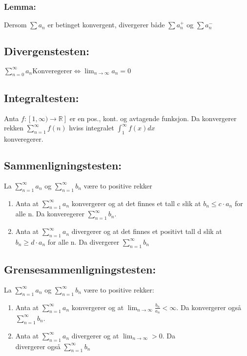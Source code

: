 \documentclass[8pt,a4paper,twocolumn,twoside]{article}
\def\real{\mathbb{R}}
\def\suminfty#1#2{\sum_{n=#1}^\infty #2}
\begin{document}
        \subsubsection*{Lemma:}
        Dersom $\sum a_n$ er betinget konvergent, divergerer både $\sum a_n^+$ og $\sum a_n^-$
        \subsection*{Divergenstesten:}
        $\sum_{n=0}^\infty a_n \text{Konveregerer} \Leftrightarrow \lim_{n\to\infty}a_n=0$
        \subsection*{Integraltesten:}
        Anta $f:[1,\infty)\to\real]$ er en pos., kont. og avtagende funksjon. Da konvergerer rekken $\sum_{n=1}^\infty f(n)$ hviss
        integralet $\int_1^\infty f(x)dx$ \\konveregerer.
        \subsection*{Sammenligningstesten:}
        La $\suminfty{1}{a_n}$ og $\suminfty{1}{b_n}$ være to positive rekker
        \begin{enumerate}
            \item Anta at $\suminfty{1}{a_n}$ konvergerer og at det finnes et tall c slik at $b_n \leq c\cdot a_n$ for alle n. Da konveregerer $\suminfty{1}{b_n}$.
            \item Anta at $\suminfty{1}{a_n}$ divergerer og at det finnes et positivt tall d slik at $b_n \geq d\cdot a_n$ for alle n. Da divergerer $\suminfty{1}{b_n}$
        \end{enumerate}
        \subsection*{Grensesammenligningstesten:}
        La $\suminfty{1}{a_n}$ og $\suminfty{1}{b_n}$ være to positive rekker:
        \begin{enumerate}
            \item Anta at $\suminfty{1}{a_n}$ konvergerer og at $\lim_{n\to\infty}\frac{b_n}{a_n}<\infty$. Da konvergerer også $\suminfty{1}{b_n}$.
            \item Anta at $\suminfty{1}{a_n}$ divergerer og at $\lim_{n\to\infty}>0$. Da \\divergerer også $\suminfty{1}{b_n}$
        \end{enumerate}
\end{document}
